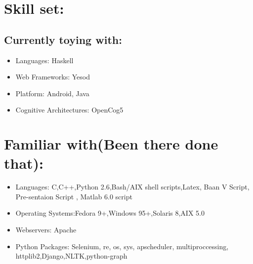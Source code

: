 \section {Skill set:}
	\subsection {Currently toying with:}
		\begin{itemize}
			\item Languages: Haskell

	 		\item Web Frameworks: Yesod

			\item Platform: Android, Java

	 		\item Cognitive Architectures: OpenCog5
		\end{itemize}
		
\section {Familiar with(Been there done that):}
	\begin{itemize}
	
		\item Languages: C,C++,Python 2.6,Bash/AIX shell scripts,Latex, Baan V Script, Pre-sentaion Script , Matlab 6.0 script

		\item Operating Systems:Fedora 9+,Windows 95+,Solaris 8,AIX 5.0

		\item Webservers: Apache

		\item Python Packages: Selenium, re, os, sys, apscheduler, multiproccessing, httplib2,Django,NLTK,python-graph
	\end{itemize}
